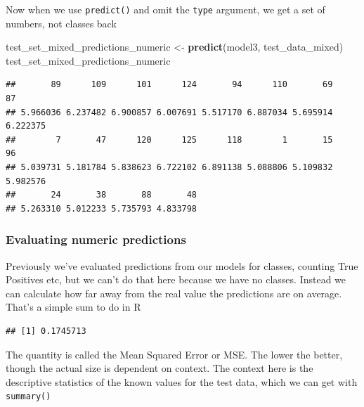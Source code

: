 \documentclass[
]{book}
\newenvironment{Shaded}{\begin{snugshade}}{\end{snugshade}}
\newcommand{\DecValTok}[1]{\textcolor[rgb]{0.00,0.00,0.81}{#1}}
\newcommand{\KeywordTok}[1]{\textcolor[rgb]{0.13,0.29,0.53}{\textbf{#1}}}
\newcommand{\NormalTok}[1]{#1}
\newcommand{\OperatorTok}[1]{\textcolor[rgb]{0.81,0.36,0.00}{\textbf{#1}}}
\newcommand{\StringTok}[1]{\textcolor[rgb]{0.31,0.60,0.02}{#1}}
\begin{document}
Now when we use \texttt{predict()} and omit the \texttt{type} argument, we get a set of numbers, not classes back

\begin{Shaded}
\begin{Highlighting}[]
\NormalTok{test_set_mixed_predictions_numeric <-}\StringTok{ }\KeywordTok{predict}\NormalTok{(model3, test_data_mixed)}
\NormalTok{test_set_mixed_predictions_numeric}
\end{Highlighting}
\end{Shaded}

\begin{verbatim}
##       89      109      101      124       94      110       69       87 
## 5.966036 6.237482 6.900857 6.007691 5.517170 6.887034 5.695914 6.222375 
##        7       47      120      125      118        1       15       96 
## 5.039731 5.181784 5.838623 6.722102 6.891138 5.088806 5.109832 5.982576 
##       24       38       88       48 
## 5.263310 5.012233 5.735793 4.833798
\end{verbatim}

\hypertarget{evaluating-numeric-predictions}{%
\subsubsection{Evaluating numeric predictions}\label{evaluating-numeric-predictions}}

Previously we've evaluated predictions from our models for classes, counting True Positives etc, but we can't do that here because we have no classes. Instead we can calculate how far away from the real value the predictions are on average. That's a simple sum to do in R

\begin{Shaded}
\end{Shaded}

\begin{verbatim}
## [1] 0.1745713
\end{verbatim}

The quantity is called the Mean Squared Error or MSE. The lower the better, though the actual size is dependent on context. The context here is the descriptive statistics of the known values for the test data, which we can get with \texttt{summary()}
\end{document}
